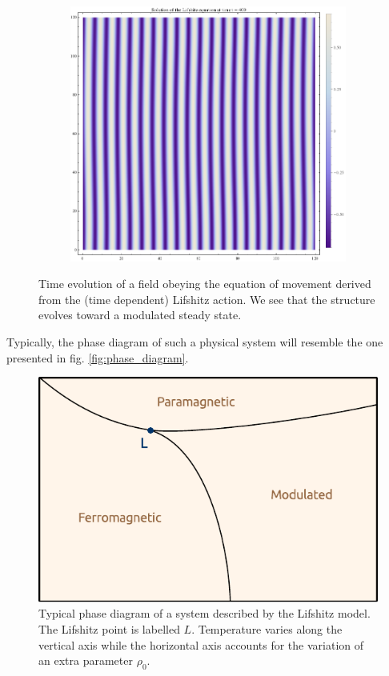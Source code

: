 \begin{figure}[htp]
\begin{subfigure}{.33\textwidth}
	\centering
	\includegraphics[width=.9\linewidth]{img/chap1/sol_Lif_t400.png}
	\caption{}
	\label{lif_t400}
\end{subfigure}
\caption{Time evolution of a field obeying the equation of movement derived from the (time dependent) Lifshitz action. We see that the structure evolves toward a modulated steady state.}
\label{fig:evol_strip}
\end{figure}


Typically, the phase diagram of such a physical system will resemble the one presented in fig. \eqref{fig:phase_diagram}.
\begin{figure}[htp]
\begin{center}
\includegraphics[scale=1]{img/chap1/phase_diagram_2.pdf}
\caption{Typical phase diagram of a system described by the Lifshitz model. The Lifshitz point is labelled $L$. Temperature varies along the vertical axis while the horizontal axis accounts for the variation of an extra parameter $\rho_0$.}
\label{fig:phase_diagram}
\end{center}
\end{figure}

